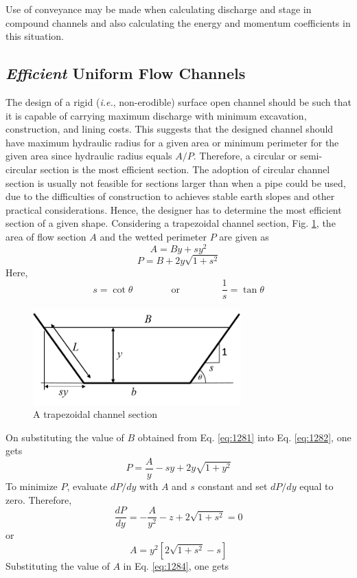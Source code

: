 \documentclass[a4paper, 12pt, british]{article} %
\numberwithin{equation}{section}
\numberwithin{figure}{section}
\numberwithin{table}{section}
\begin{document}
Use of conveyance may be made when calculating discharge and stage in compound channels and also calculating the energy and momentum coefficients in this situation.

\subsection{\textit{Efficient} Uniform Flow Channels }

The design of a rigid (\emph{i.e.}, non-erodible) surface
open channel should be such that it is capable of carrying
maximum discharge with minimum excavation, construction, and
lining costs. This suggests that the designed
channel should have maximum hydraulic radius for a given
area or minimum perimeter for the given area since hydraulic
radius equals $A/P$. Therefore, a circular or semi-circular
section is the most efficient section. The adoption of
circular channel section is usually not feasible for sections larger than when a pipe could be used, due to the
difficulties of construction to achieves stable earth slopes
and other practical considerations. Hence, the designer has
to determine the most efficient section of a given shape. 
Considering a trapezoidal channel section, Fig. \ref{fig:section_trap_2018}, the
area of flow section $A$ and the wetted perimeter $P$ are given as
\begin{equation}
A = By + sy^2
\label{eq:1281}
\end{equation}
\begin{equation}
P = B +2y \sqrt{1 + s^2}
\label{eq:1282}
\end{equation}
Here,
\begin{equation*}
s = \cot \theta \qquad \qquad \text{or }  \qquad \qquad \frac{1}{s}= \tan\theta
\end{equation*}

\begin{figure}[H]
	\centering
	\includegraphics[width=8cm]{./images/section_trap_2018_a.png}
	\caption{A trapezoidal channel section}
	\label{fig:section_trap_2018}
\end{figure}
On substituting the value of $B$ obtained from Eq. \ref{eq:1281}
into Eq. \ref{eq:1282}, one gets
\begin{equation}
P = \frac{A}{y} - sy +2y \sqrt{1 + y^2}
\label{eq:1283}
\end{equation}	
To minimize $P$, evaluate $dP/dy$ with $A$ and $s$ constant
and set $dP/dy$ equal to zero. Therefore, 
\begin{equation*}
\frac{dP}{dy} = -\frac{A}{y^2} - z + 2 \sqrt{1 + s^2} = 0
\end{equation*}
or
\begin{equation}
A = y^2 \left [ 2 \sqrt{1 + s^2} - s \right ]
\label{eq:1284}
\end{equation}
Substituting the value of $A$ in Eq. \ref{eq:1284}, one gets 
\end{document}
